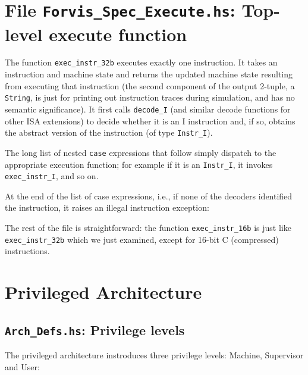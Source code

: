\documentclass[11pt]{article}
\begin{document}
\section{File {\tt Forvis\_Spec\_Execute.hs}: Top-level execute function}

\label{sec_execute}

The function \verb|exec_instr_32b| executes exactly one instruction.
It takes an instruction and machine state and returns the updated
machine state resulting from executing that instruction (the second
component of the output 2-tuple, a \verb|String|, is just for printing
out instruction traces during simulation, and has no semantic
significance).  It first calls \verb|decode_I| (and similar decode
functions for other ISA extensions) to decide whether it is an I
instruction and, if so, obtains the abstract version of the
instruction (of type \verb|Instr_I|).



The long list of nested \verb|case| expressions that follow simply
dispatch to the appropriate execution function; for example if it is
an \verb|Instr_I|, it invokes \verb|exec_instr_I|, and so on.



At the end of the list of case expressions, i.e., if none of the
decoders identified the instruction, it raises an illegal instruction
exception:



The rest of the file is straightforward: the function
\verb|exec_instr_16b| is just like \verb|exec_instr_32b| which we just
examined, except for 16-bit C (compressed) instructions.


\section{Privileged Architecture}


\subsection{{\tt Arch\_Defs.hs}: Privilege levels}

The privileged architecture instroduces three privilege
levels: Machine, Supervisor and User:
\end{document}
